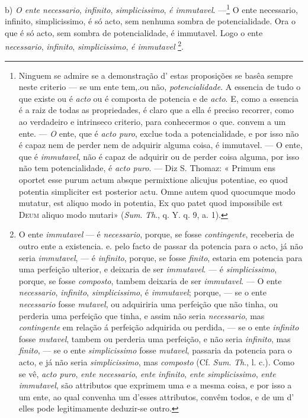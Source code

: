 b) \emph{O ente necessario}, \emph{infinito}, \emph{simplicissimo}, \emph{é immutavel}. ---\footnote{Ninguem se admire se a demonstração d' estas proposições se basêa sempre neste criterio --- se um ente tem,.ou não, \emph{potencialidade}. A essencia de tudo o que existe ou é \emph{acto} ou é composta de potencia e de \emph{acto}. E, como a essencia é a raiz de todas as propriedades, é claro que a ella é preciso recorrer, como ao verdadeiro e intrinseco criterio, para conhecermos o que. convem a um ente. --- \emph{O} ente, que é \emph{acto puro}, exclue toda a potencialidade, e por isso não é capaz nem de perder nem de adquirir alguma coisa, é immutavel. --- O ente, que é \emph{immutavel}, não é capaz de adquirir ou de perder coisa alguma, por isso não tem potencialidade, é \emph{acto puro}. --- Diz S. Thomaz: « Primum ens oportet esse purum actum absque permixtione alicujus potentiae, eo quod potentia simpliciter est posterior actu. Omne autem quod quocumque modo mutatur, est aliquo modo in potentia, Ex quo patet quod impossibile est \textsc{Deum} aliquo modo mutari» (\emph{Sum}. \emph{Th}., q. Y. q. 9, a. 1).}   O ente necessario, infinito, simplicissimo, é só acto, sem nenhuma sombra de potencialidade. Ora o que é só acto, sem sombra de potencialidade, é immutavel. Logo o ente \emph{necessario}, \emph{infinito}, \emph{simplicissimo}, \emph{é immutavel} \footnote{O ente \emph{immutavel} --- é \emph{necessario}, porque, se fosse \emph{contingente}, receberia de outro ente a existencia. e. pelo facto de passar da potencia para o acto, já não seria \emph{immutavel}, --- é \emph{infinito}, porque, se fosse \emph{finito}, estaria em potencia para uma perfeição ulterior, e deixaria de ser \emph{immutavel}. --- é \emph{simplicissimo}, porque, se fosse \emph{composto}, tambem deixaria de ser \emph{immutavel}. --- O ente \emph{necessario}, \emph{infinito}, \emph{simplicissimo}, é \emph{immutavel}; porque, --- se o ente \emph{necessario} fosse \emph{mutavel}, ou adquiriria uma perfeição que não tinha, ou perderia uma perfeição que tinha, e assim não seria \emph{necessario}, mas \emph{contingente} em relação á perfeição adquirida ou perdida, --- se o ente \emph{infinito} fosse \emph{mutavel}, tambem ou perderia uma perfeição, e não seria \emph{infinito}, mas \emph{finito}, --- se o ente \emph{simplicissimo} fosse \emph{mutavel}, passaria da potencia para o acto, e já não seria \emph{simplicissimo}, mas \emph{composto} (Cf. \emph{Sum}. \emph{Th}., l. c.). Como se vê, \emph{acto puro}, \emph{ente necessario}, \emph{ente infinito}, \emph{ente simplicissimo}, \emph{ente immutavel}, são attributos que exprimem uma e a mesma coisa, e por isso a um ente, ao qual convenha um d'esses attributos, convêm todos, e de um d' elles pode legitimamente deduzir-se outro.}.

